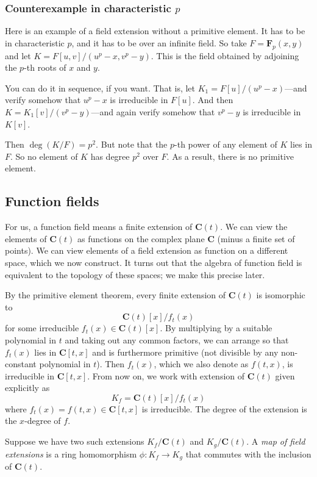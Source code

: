 \documentclass[11pt]{article}
\begin{document}
\subsubsection{Counterexample in characteristic \(p\)}
\label{sec:orgfdd0571}

Here is an example of a field extension without a primitive element.
It has to be in characteristic \(p\), and it has to be over an infinite field.
So take \(F = \mathbf{F}_p(x,y)\) and let \(K = F[u,v]/(u^p-x, v^p-y)\).
This is the field obtained by adjoining the \(p\)-th roots of \(x\) and \(y\).

You can do it in sequence, if you want. 
That is, let \(K_1 = F[u]/(u^p-x)\)---and verify somehow that \(u^p-x\) is irreducible in \(F[u]\).
And then \(K = K_1[v]/(v^p-y)\)---and again verify somehow that \(v^p-y\) is irreducible in \(K[v]\).

Then \(\deg(K/F) = p^2\).
But note that the \(p\)-th power of any element of \(K\) lies in \(F\).
So no element of \(K\) has degree \(p^2\) over \(F\).
As a result, there is no primitive element.
\subsection{Function fields}
\label{sec:org668ed08}
For us, a function field means a finite extension of \(\mathbf{C}(t)\).
We can view the elements of \(\mathbf{C}(t)\) as functions on the complex plane \(\mathbf{C}\) (minus a finite set of points).
We can view elements of a field extension as function on a different space, which we now construct.
It turns out that the algebra of function field is equivalent to the topology of these spaces; we make this precise later.

By the primitive element theorem, every finite extension of \(\mathbf{C}(t)\) is isomorphic to
\[ \mathbf{C}(t)[x]/f_t(x)\]
for some irreducible \(f_t(x) \in \mathbf{C}(t)[x]\).
By multiplying by a suitable polynomial in \(t\) and taking out any common factors, we can arrange so that \(f_t(x)\) lies in \(\mathbf{C}[t,x]\) and is furthermore primitive (not divisible by any non-constant polynomial in \(t\)).
Then \(f_t(x)\), which we also denote as \(f(t,x)\), is irreducible in \(\mathbf{C}[t,x]\).
From now on, we work with extension of \(\mathbf{C}(t)\) given explicitly as
\[ K_{f} = \mathbf{C}(t)[x]/f_t(x)\]
where \(f_t(x) = f(t,x)\in \mathbf{C}[t,x]\) is irreducible.
The degree of the extension is the \(x\)-degree of \(f\).

Suppose we have two such extensions \(K_f / \mathbf{C}(t)\) and \(K_g / \mathbf{C}(t)\).
A \emph{map of field extensions} is a ring homomorphism \(\phi \colon K_f \to K_g\) that commutes with the inclusion of \(\mathbf{C}(t)\).
\end{document}
